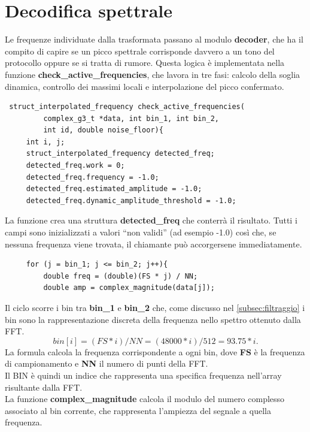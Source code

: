  \section{Decodifica spettrale}

 Le frequenze individuate dalla trasformata passano al modulo \textbf{decoder}, 
 che ha il compito di capire se un picco spettrale corrisponde davvero a un tono
  del protocollo oppure se si tratta di rumore. Questa logica è implementata nella funzione
   \textbf{check\_active\_frequencies}, che lavora in tre fasi: calcolo della soglia dinamica,
    controllo dei massimi locali e interpolazione del picco confermato.  
 
 \begin{verbatim}
 struct_interpolated_frequency check_active_frequencies(
         complex_g3_t *data, int bin_1, int bin_2,
         int id, double noise_floor){
     int i, j;
     struct_interpolated_frequency detected_freq;
     detected_freq.work = 0;
     detected_freq.frequency = -1.0;
     detected_freq.estimated_amplitude = -1.0;
     detected_freq.dynamic_amplitude_threshold = -1.0;
 \end{verbatim}
 
 La funzione crea una struttura \textbf{detected\_freq} che conterrà il risultato. 
 Tutti i campi sono inizializzati a valori “non validi” (ad esempio -1.0) così che, 
 se nessuna frequenza viene trovata, il chiamante può accorgersene immediatamente.  
 
 \begin{verbatim}
     for (j = bin_1; j <= bin_2; j++){
         double freq = (double)(FS * j) / NN;
         double amp = complex_magnitude(data[j]);
 \end{verbatim}
 
 Il ciclo scorre i bin tra \textbf{bin\_1} e \textbf{bin\_2} che, come discusso nel \autoref{subsec:filtraggio} i bin sono 
 la rappresentazione discreta della frequenza nello spettro ottenuto dalla FFT.
 \begin{equation}
    bin[i] = (FS * i) / NN = (48000 * i) / 512 = 93.75 * i.
 \end{equation}
  La formula calcola la frequenza corrispondente a ogni bin, dove \textbf{FS} è la frequenza di campionamento e \textbf{NN} il numero di punti della FFT.\\
  Il BIN è quindi un indice che rappresenta una specifica frequenza nell'array risultante dalla FFT.\\
   La funzione \textbf{complex\_magnitude} calcola il modulo del numero complesso associato al bin corrente, che rappresenta l’ampiezza del segnale a quella frequenza.\\

